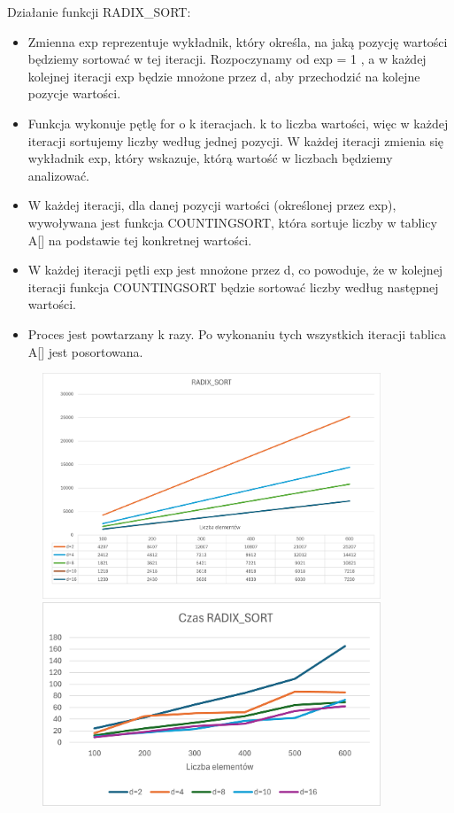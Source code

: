 \documentclass{article}
\begin{document}
		Działanie funkcji RADIX\_SORT:
		\begin{itemize}
			\item Zmienna exp reprezentuje wykładnik, który określa, na jaką pozycję wartości będziemy sortować w tej iteracji. Rozpoczynamy od exp = 1 , a w każdej kolejnej iteracji exp będzie mnożone przez d, aby przechodzić na kolejne pozycje wartości.
			
			\item Funkcja wykonuje pętlę for o k iteracjach. k to liczba wartości, więc w każdej iteracji sortujemy liczby według jednej pozycji.
			W każdej iteracji zmienia się wykładnik exp, który wskazuje, którą wartość w liczbach będziemy analizować.
			
			\item W każdej iteracji, dla danej pozycji wartości (określonej przez exp), wywoływana jest funkcja COUNTINGSORT, która sortuje liczby w tablicy A[] na podstawie tej konkretnej wartości.
			
			\item W każdej iteracji pętli exp jest mnożone przez d, co powoduje, że w kolejnej iteracji funkcja COUNTINGSORT będzie sortować liczby według następnej wartości.
			
			\item Proces jest powtarzany k razy. Po wykonaniu tych wszystkich iteracji tablica A[] jest posortowana. 
		\end{itemize}
		
		\begin{figure}[H]
			\centering
			\includegraphics[width=0.9\textwidth]{RS11.png}
			\includegraphics[width=0.9\textwidth]{RS12.png}
		\end{figure}
		
\end{document}
